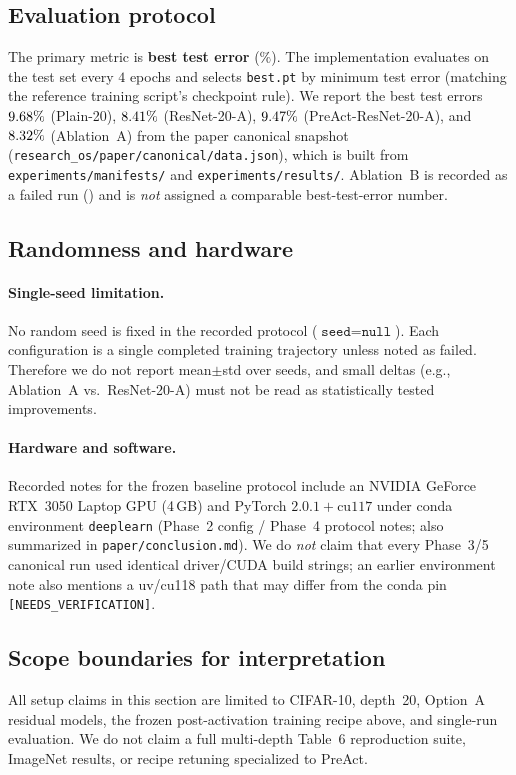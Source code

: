 \subsection{Evaluation protocol}
\label{sec:setup-eval}

The primary metric is \textbf{best test error} ($\%$).
The implementation evaluates on the test set every $4$ epochs and selects
\texttt{best.pt} by minimum test error
(matching the reference training script's checkpoint rule).
We report the best test errors
$9.68\%$ (Plain-20),
$8.41\%$ (ResNet-20-A),
$9.47\%$ (PreAct-ResNet-20-A), and
$8.32\%$ (Ablation~A)
from the paper canonical snapshot
(\texttt{research\_os/paper/canonical/data.json}),
which is built from
\texttt{experiments/manifests/} and \texttt{experiments/results/}.
Ablation~B is recorded as a failed run (\AblationBStatus) and is \emph{not} assigned a
comparable best-test-error number.

\subsection{Randomness and hardware}
\label{sec:setup-hw}

\paragraph{Single-seed limitation.}
No random seed is fixed in the recorded protocol ($\texttt{seed}{=}\texttt{null}$).
Each configuration is a single completed training trajectory unless noted as failed.
Therefore we do not report mean$\pm$std over seeds, and small deltas
(e.g., Ablation~A vs.\ ResNet-20-A) must not be read as statistically tested improvements.

\paragraph{Hardware and software.}
Recorded notes for the frozen baseline protocol include an
NVIDIA GeForce RTX~3050 Laptop GPU (4\,GB) and PyTorch $2.0.1{+}\mathrm{cu117}$
under conda environment \texttt{deeplearn}
(Phase~2 config / Phase~4 protocol notes; also summarized in \texttt{paper/conclusion.md}).
We do \emph{not} claim that every Phase~3/5 canonical run used identical driver/CUDA build strings;
an earlier environment note also mentions a uv/cu118 path that may differ from the conda pin
\texttt{[NEEDS\_VERIFICATION]}.

\subsection{Scope boundaries for interpretation}
\label{sec:setup-scope}

All setup claims in this section are limited to CIFAR-10, depth~20, Option~A residual models,
the frozen post-activation training recipe above, and single-run evaluation.
We do not claim a full multi-depth Table~6 reproduction suite, ImageNet results,
or recipe retuning specialized to PreAct.
